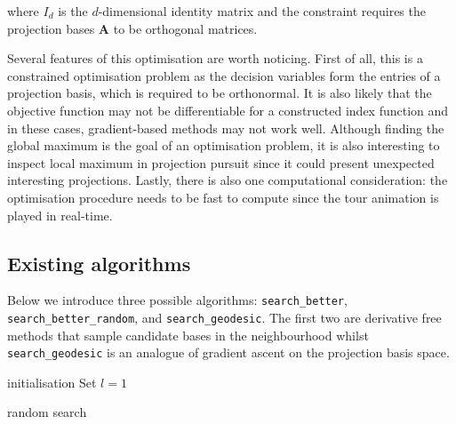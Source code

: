\noindent where \(I_d\) is the \(d\)-dimensional identity matrix and the
constraint requires the projection bases \(\mathbf{A}\) to be orthogonal
matrices.

Several features of this optimisation are worth noticing. First of all,
this is a constrained optimisation problem as the decision variables
form the entries of a projection basis, which is required to be
orthonormal. It is also likely that the objective function may not be
differentiable for a constructed index function and in these cases,
gradient-based methods may not work well. Although finding the global
maximum is the goal of an optimisation problem, it is also interesting
to inspect local maximum in projection pursuit since it could present
unexpected interesting projections. Lastly, there is also one
computational consideration: the optimisation procedure needs to be fast
to compute since the tour animation is played in real-time.

\hypertarget{existing-algorithms}{%
\subsection{Existing algorithms}\label{existing-algorithms}}

Below we introduce three possible algorithms: \texttt{search\_better},
\texttt{search\_better\_random}, and \texttt{search\_geodesic}. The
first two are derivative free methods that sample candidate bases in the
neighbourhood whilst \texttt{search\_geodesic} is an analogue of
gradient ascent on the projection basis space.

\begin{algorithm}
\SetAlgoLined
  initialisation\;
  Set $l = 1$\;
  \caption{random search}
  \label{random-search}
\end{algorithm}

